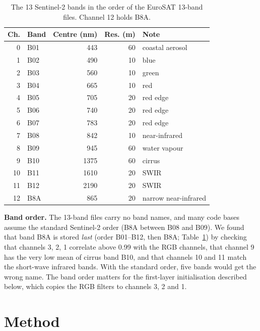 \documentclass[twoside,a4paper,11pt]{article}
\begin{document}
\begin{table}[t]
\centering
\caption{The 13 Sentinel-2 bands in the order of the EuroSAT 13-band files. Channel 12 holds B8A.}
\label{tab:bands}
\small
\begin{tabular}{rlrrl}
\toprule
Ch. & Band & Centre (nm) & Res. (m) & Note \\
\midrule
0 & B01 & 443 & 60 & coastal aerosol \\
1 & B02 & 490 & 10 & blue \\
2 & B03 & 560 & 10 & green \\
3 & B04 & 665 & 10 & red \\
4 & B05 & 705 & 20 & red edge \\
5 & B06 & 740 & 20 & red edge \\
6 & B07 & 783 & 20 & red edge \\
7 & B08 & 842 & 10 & near-infrared \\
8 & B09 & 945 & 60 & water vapour \\
9 & B10 & 1375 & 60 & cirrus \\
10 & B11 & 1610 & 20 & SWIR \\
11 & B12 & 2190 & 20 & SWIR \\
12 & B8A & 865 & 20 & narrow near-infrared \\
\bottomrule
\end{tabular}
\end{table}

\textbf{Band order.} The 13-band files carry no band names, and many code bases assume the standard Sentinel-2 order (B8A between B08 and B09). We found that band B8A is stored \emph{last} (order B01--B12, then B8A; Table~\ref{tab:bands}) by checking that channels 3, 2, 1 correlate above 0.99 with the RGB channels, that channel 9 has the very low mean of cirrus band B10, and that channels 10 and 11 match the short-wave infrared bands. With the standard order, five bands would get the wrong name. The band order matters for the first-layer initialisation described below, which copies the RGB filters to channels 3, 2 and 1.

\section{Method}\label{sec:method}
\end{document}
